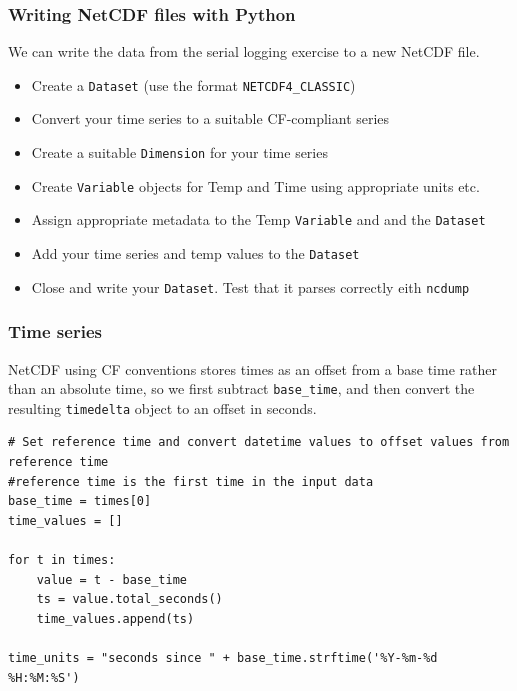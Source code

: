 \documentclass[aspectratio=1610,9pt]{beamer} %
\begin{document}
\begin{frame}
\frametitle{Writing NetCDF files with
Python}

We can write the data from the serial logging exercise to a new NetCDF
file.

\begin{itemize}
\itemsep1pt\parskip0pt
\item
  Create a \texttt{Dataset} (use the format \texttt{NETCDF4\_CLASSIC})
\item
  Convert your time series to a suitable CF-compliant series
\item
  Create a suitable \texttt{Dimension} for your time series
\item
  Create \texttt{Variable} objects for Temp and Time using appropriate
  units etc.
\item
  Assign appropriate metadata to the Temp \texttt{Variable} and and the
  \texttt{Dataset}
\item
  Add your time series and temp values to the \texttt{Dataset}
\item
  Close and write your \texttt{Dataset}. Test that it parses correctly
  eith \texttt{ncdump}
\end{itemize}

\end{frame}
\begin{frame}[fragile]
\frametitle{Time series}

NetCDF using CF conventions stores times as an offset from a base time
rather than an absolute time, so we first subtract \texttt{base\_time},
and then convert the resulting \texttt{timedelta} object to an offset in
seconds.

\begin{verbatim}
# Set reference time and convert datetime values to offset values from reference time
#reference time is the first time in the input data
base_time = times[0]
time_values = []

for t in times:
    value = t - base_time
    ts = value.total_seconds()
    time_values.append(ts)

time_units = "seconds since " + base_time.strftime('%Y-%m-%d %H:%M:%S')
\end{verbatim}

\end{frame}
\end{document}
